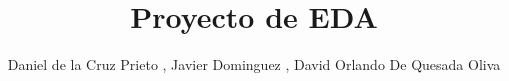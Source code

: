 \documentclass{article}
\begin{document}
    \title{Proyecto de EDA} 
    \author{Daniel de la Cruz Prieto , Javier Dominguez , David Orlando De Quesada Oliva} 

    \maketitle
\end{document}
